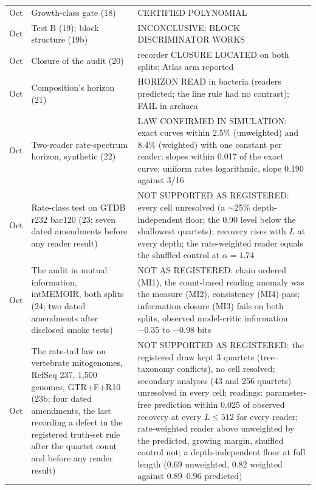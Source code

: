 \documentclass[11pt]{article}
\begin{document}
\begin{center}
\begin{tabular}{@{}>{\raggedright\arraybackslash}p{1.4cm}>{\raggedright\arraybackslash}p{4.3cm}>{\raggedright\arraybackslash}p{8.5cm}@{}}
9 Oct & Growth-class gate (18) & CERTIFIED POLYNOMIAL \\
9 Oct & Test B (19); block structure (19b) & INCONCLUSIVE; BLOCK DISCRIMINATOR WORKS \\
9 Oct & Closure of the audit (20) & recorder CLOSURE LOCATED on both splits; Atlas arm reported \\
9 Oct & Composition's horizon (21) & HORIZON READ in bacteria (readers predicted; the line rule had no contrast); FAIL in archaea \\
14 Oct & Two-reader rate-spectrum horizon, synthetic (22) & LAW CONFIRMED IN SIMULATION: exact curves within 2.5\% (unweighted) and 8.4\% (weighted) with one constant per reader; slopes within 0.017 of the exact curve; uniform rates logarithmic, slope 0.190 against 3/16 \\
14 Oct & Rate-class test on GTDB r232 bac120 (23; seven dated amendments before any reader result) & NOT SUPPORTED AS REGISTERED: every cell unresolved (a $\sim$25\% depth-independent floor; the 0.90 level below the shallowest quartets); recovery rises with $L$ at every depth; the rate-weighted reader equals the shuffled control at $\alpha=1.74$ \\
14 Oct & The audit in mutual information, intMEMOIR, both splits (24; two dated amendments after disclosed smoke tests) & NOT AS REGISTERED: chain ordered (MI1), the count-based reading anomaly was the measure (MI2), consistency (MI4) pass; information closure (MI3) fails on both splits, observed model-critic information $-0.35$ to $-0.98$ bits \\
14 Oct & The rate-tail law on vertebrate mitogenomes, RefSeq 237, 1,500 genomes, GTR+F+R10 (23b; four dated amendments, the last recording a defect in the registered truth-set rule after the quartet count and before any reader result) & NOT SUPPORTED AS REGISTERED: the registered draw kept 3 quartets (tree--taxonomy conflicts), no cell resolved; secondary analyses (43 and 256 quartets) unresolved in every cell; readings: parameter-free prediction within 0.025 of observed recovery at every $L\le512$ for every reader; rate-weighted reader above unweighted by the predicted, growing margin, shuffled control not; a depth-independent floor at full length (0.69 unweighted, 0.82 weighted against 0.89--0.96 predicted) \\
\bottomrule
\end{tabular}
\end{center}
\end{document}
